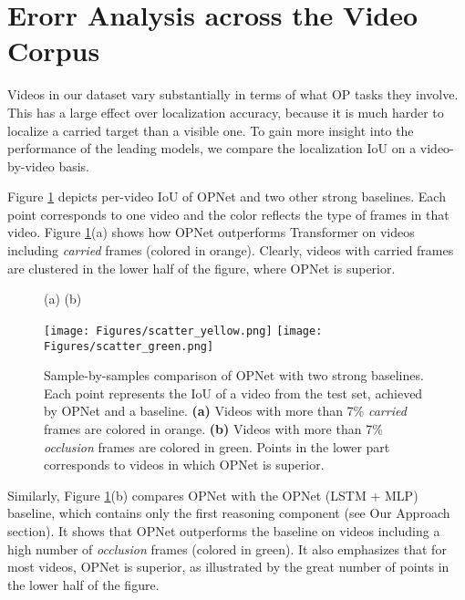 \documentclass[]{llncs}
\newcommand{\figref}[1]{Figure \ref{#1}}
\begin{document}
\appendix
















\section{Erorr Analysis across the Video Corpus}
Videos in our dataset vary substantially in terms of what OP tasks they involve. This has a large effect over localization accuracy, because it is much harder to localize a carried target  than a visible one. To gain more insight into the performance of the leading models, we compare the localization IoU on a video-by-video basis.

Figure \ref{fig:overall_iou_model_comparison} depicts per-video IoU of OPNet and two other strong baselines. Each point corresponds to one video and the color reflects the type of frames in that video. Figure \ref{fig:overall_iou_model_comparison}(a) shows how OPNet outperforms Transformer on videos including \textit{carried} frames (colored in orange). Clearly, videos with carried frames are clustered in the lower half of the figure, where OPNet is superior.

\begin{figure}[]
    \hspace{90pt}(a) \hspace{150pt} (b)
    \begin{center}
    \texttt{[image: Figures/scatter\_yellow.png]}
    \texttt{[image: Figures/scatter\_green.png]}
\caption{Sample-by-samples comparison of OPNet with two strong baselines. Each point represents the IoU of a video from the test set, achieved by OPNet and a baseline. \textbf{(a)} Videos with more than 7\% \textit{carried} frames are colored in orange. \textbf{(b)} Videos with more than 7\% \textit{occlusion} frames are colored in green. Points in the lower part corresponds to videos in which OPNet is superior.}
    \label{fig:overall_iou_model_comparison}
    \end{center}
\end{figure}

Similarly, \figref{fig:overall_iou_model_comparison}(b) compares OPNet with the OPNet (LSTM + MLP) baseline, which contains only the first reasoning component (see Our Approach section). It shows that OPNet outperforms the baseline on videos including a high number of \textit{occlusion} frames (colored in green). It also emphasizes that for most videos, OPNet is superior, as illustrated by the great number of points in the lower half of the figure.
\end{document}
